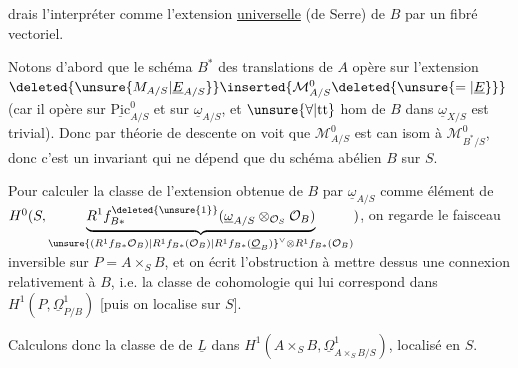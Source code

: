 drais l'interpréter comme l'extension \uline{universelle} (de Serre) de $B$ par un fibré vectoriel.

Notons d'abord que le schéma $B^{*}$ des translations de $A$ opère  sur l'extension $\deleted{\unsure{M_{A/S}|\underline E_{A/S}}}\inserted{\mathcal M_{A/S}^{0}\deleted{\unsure{=|\underline E}}}$ (car il opère  sur $\underline{\mathrm{Pic}}^{0}_{A/S}$ et sur $\underline{\omega}_{A/S}$\deleted{)}, et $\unsure{\forall|\mathrm{tt}}$ hom de $B$ dans $\underline{\omega}_{X/S}$ est trivial). Donc par théorie de descente on voit que $\mathcal M^{0}_{A/S}$ est can isom à $\mathcal M^{0}_{B^{*}/S}$, donc c'est un invariant qui ne dépend que du  schéma abélien $B$ sur $S$.

Pour calculer la classe de l'extension obtenue de $B$ par $\underline{\omega}_{A/S}$ comme élément de $H^{0}(S,\underbrace{R^{1}f_{B*}^{\deleted{\unsure{1}}}(\underline{\omega}_{A/S}\otimes_{\mathcal O_S}\mathcal O_B)}_{\unsure{(R^{1}f_{B*}\mathcal O_{B})|R^{1}f_{B*}(\mathcal O_{B})|R^{1}f_{B*}(\underline{\mathcal O}_{B})}^{\vee}\otimes R^{1}f_{B*}(\mathcal O_{B})})$, on regarde  le faisceau inversible  sur $P=A\times_{S}B$, et on écrit
l'obstruction à mettre dessus une connexion relativement à $B$, i.e. la classe de cohomologie qui lui correspond dans $H^{1}(P,\underline{\Omega}^{1}_{P/B})$ [puis on localise sur $S$].

Calculons donc la classe de  de $\underline L$ dans $H^{1}(A\times_{S}B,\underline{\Omega}^{1}_{A\times_{S}B/S})$, localisé en $S$.


